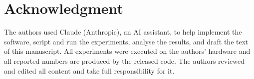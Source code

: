 \section*{Acknowledgment}
The authors used Claude (Anthropic), an AI assistant, to help implement the software, script and run the experiments, analyse the results, and draft the text of this manuscript. All experiments were executed on the authors' hardware and all reported numbers are produced by the released code. The authors reviewed and edited all content and take full responsibility for it.
